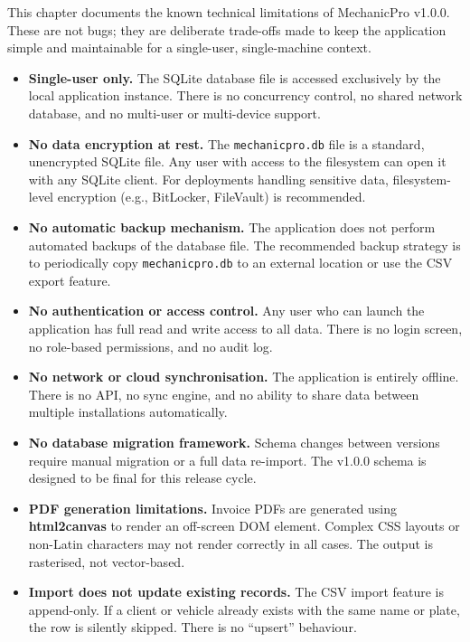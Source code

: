 \documentclass[12pt, a4paper]{report}
\newcommand{\term}[1]{\textbf{\color{Blue}#1}}
\begin{document}
	This chapter documents the known technical limitations of MechanicPro v1.0.0.
	These are not bugs; they are deliberate trade-offs made to keep the
	application simple and maintainable for a single-user, single-machine context.

	\begin{itemize}
		\item \textbf{Single-user only.} The SQLite database file is accessed
		      exclusively by the local application instance. There is no
		      concurrency control, no shared network database, and no
		      multi-user or multi-device support.

		\item \textbf{No data encryption at rest.} The \texttt{mechanicpro.db}
		      file is a standard, unencrypted SQLite file. Any user with access
		      to the filesystem can open it with any SQLite client. For
		      deployments handling sensitive data, filesystem-level encryption
		      (e.g., BitLocker, FileVault) is recommended.

		\item \textbf{No automatic backup mechanism.} The application does not
		      perform automated backups of the database file. The recommended
		      backup strategy is to periodically copy \texttt{mechanicpro.db}
		      to an external location or use the CSV export feature.

		\item \textbf{No authentication or access control.} Any user who can
		      launch the application has full read and write access to all data.
		      There is no login screen, no role-based permissions, and no audit
		      log.

		\item \textbf{No network or cloud synchronisation.} The application is
		      entirely offline. There is no API, no sync engine, and no ability
		      to share data between multiple installations automatically.

		\item \textbf{No database migration framework.} Schema changes between
		      versions require manual migration or a full data re-import. The
		      v1.0.0 schema is designed to be final for this release cycle.

		\item \textbf{PDF generation limitations.} Invoice PDFs are generated
		      using \term{html2canvas} to render an off-screen DOM element.
		      Complex CSS layouts or non-Latin characters may not render
		      correctly in all cases. The output is rasterised, not vector-based.

		\item \textbf{Import does not update existing records.} The CSV import
		      feature is append-only. If a client or vehicle already exists with
		      the same name or plate, the row is silently skipped. There is no
		      ``upsert'' behaviour.
	\end{itemize}
\end{document}
